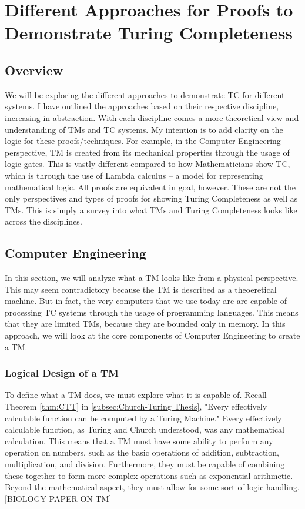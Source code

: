 \chapter{Different Approaches for Proofs to Demonstrate Turing Completeness}\label{chapter:ProofApproachesForTC}

\section{Overview}\label{sec:ProofOverview}

We will be exploring the different approaches to demonstrate TC for different systems.
I have outlined the approaches based on their respective discipline, increasing in abstraction.
With each discipline comes a more theoretical view and understanding of TMs and TC systems.
My intention is to add clarity on the logic for these proofs/techniques.
For example, in the Computer Engineering perspective, TM is created from its mechanical properties through the usage of logic gates.
This is vastly different compared to how Mathematicians show TC, which is through the use of Lambda calculus -- a model for representing mathematical logic.
All proofs are equivalent in goal, however.
These are not the only perspectives and types of proofs for showing Turing Completeness as well as TMs.
This is simply a survey into what TMs and Turing Completeness looks like across the disciplines.

\section{Computer Engineering}\label{sec:CE}

In this section, we will analyze what a TM looks like from a physical perspective.
This may seem contradictory because the TM is described as a theoeretical machine.
But in fact, the very computers that we use today are are capable of processing TC systems through the usage of programming languages.
This means that they are limited TMs, because they are bounded only in memory.
In this approach, we will look at the core components of Computer Engineering to create a TM.

\subsection{Logical Design of a TM}\label{subsec:TMLogicalDesign}

To define what a TM does, we must explore what it is capable of.
Recall Theorem \ref{thm:CTT} in \ref{subsec:Church-Turing Thesis}, "Every effectively calculable function can be computed by a Turing Machine."
Every effectively calculable function, as Turing and Church understood, was any mathematical calculation.
This means that a TM must have some ability to perform any operation on numbers, such as the basic operations of addition, subtraction, multiplication, and division.
Furthermore, they must be capable of combining these together to form more complex operations such as exponential arithmetic.
Beyond the mathematical aspect, they must allow for some sort of logic handling.
[BIOLOGY PAPER ON TM]


